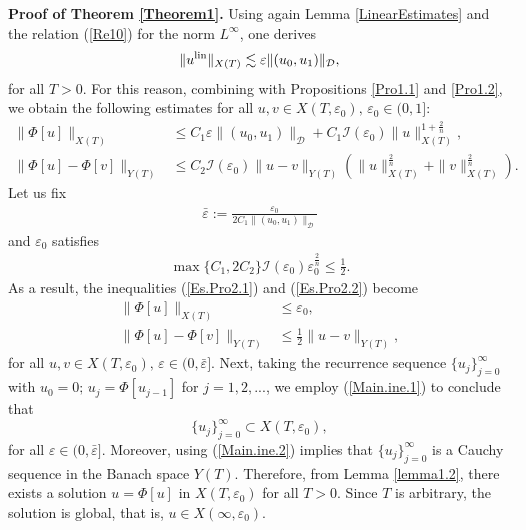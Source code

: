 \documentclass[11pt,reqno]{amsart}
\begin{document}
    \textbf{Proof of Theorem \ref{Theorem1}.}  
Using again Lemma \ref{LinearEstimates} and the relation (\ref{Re10}) for the norm $L^\infty$, one derives
\begin{align*}
    \| u^{\rm lin}\|_{X(T)} \lesssim \varepsilon\|(u_0, u_1)\|_{\mathcal{D}},
\end{align*}
for all $T > 0$.
For this reason, combining with Propositions \ref{Pro1.1} and \ref{Pro1.2}, we obtain the following estimates for all $u,v \in X(T, \varepsilon_0), \,\varepsilon_0 \in (0, 1]$:
    \begin{align}
        \| \Phi[u]\|_{X(T)} &\leq C_1 \varepsilon \|(u_0, u_1)\|_{\mathcal{D}} +  C_1 \mathcal{I}(\varepsilon_0)\|u\|_{X(T)}^{1+\frac{2}{n}}, \label{Es.Pro2.1}\\
        \|\Phi[u]-\Phi[v]\|_{Y(T)} &\leq C_2 \mathcal{I}(\varepsilon_0)\|u-v\|_{Y(T)}\left(\|u\|_{X(T)}^{\frac{2}{n}}+\|v\|_{X(T)}^{\frac{2}{n}}\right).\label{Es.Pro2.2}
    \end{align}
    Let us fix 
    \begin{align}\label{Cons1}
    \bar{\varepsilon} := \frac{\varepsilon_0}{2 C_1\|(u_0, u_1)\|_{\mathcal{D}}}
    \end{align}
    and $\varepsilon_0$ satisfies
    \begin{align*}
        \max\{C_1, 2C_2\} \mathcal{I}(\varepsilon_0) \varepsilon_0^{\frac{2}{n}} \leq \frac{1}{2}.
    \end{align*}
    As a result, the inequalities (\ref{Es.Pro2.1}) and (\ref{Es.Pro2.2}) become
    \begin{align}
        \|\Phi[u]\|_{X(T)} &\leq \varepsilon_0, \label{Main.ine.1}\\
        \|\Phi[u]-\Phi[v]\|_{Y(T)} &\leq \frac{1}{2} \|u-v\|_{Y(T)}, \label{Main.ine.2}
    \end{align}
    for all $u,v \in X(T, \varepsilon_0),\, \varepsilon \in (0, \bar{\varepsilon}]$.
   Next, taking the recurrence sequence $\{u_j\}_{j=0}^{\infty}$ with $u_0 = 0;\,  u_{j} = \Phi[u_{j-1}]$ for $j = 1,2,...$, we employ (\ref{Main.ine.1}) to conclude that $$ \{u_j\}_{j=0}^{\infty} \subset X(T,\varepsilon_0), $$ for all $\varepsilon \in (0, \bar{\varepsilon}]$. 
Moreover, using (\ref{Main.ine.2}) implies that  $\{u_j\}_{j=0}^\infty$ is a Cauchy sequence in the Banach
space $Y(T)$.  Therefore, from Lemma \ref{lemma1.2}, there exists a solution $u = \Phi[u]$ in $X(T, \varepsilon_0)$ for all $T >0$. Since $T$ is arbitrary, the solution is global, that is, $u \in X(\infty, \varepsilon_0)$. 
 
\end{document}

